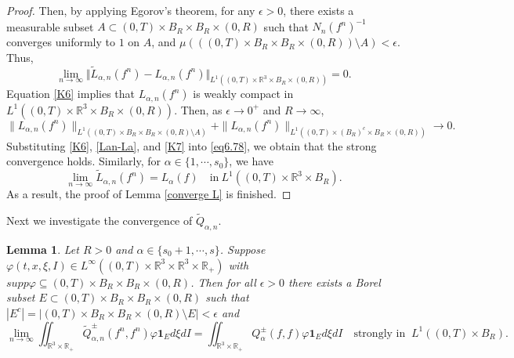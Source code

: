 \documentclass[reqno,11pt]{amsart}
\newtheorem{lemma}{Lemma}[section]
\numberwithin{equation}{section}
\def\R{\mathbb{R}}
\begin{document}
\begin{proof}
Then, by applying Egorov's theorem, for any $\epsilon > 0$, there exists a measurable subset $A \subset (0, T) \times B_R \times B_R \times (0, R)$ such that $ N_n (f^n)^{-1} $ converges uniformly to $1$ on $A$, and $\mu \left(((0, T) \times B_R \times B_R \times (0, R)) \setminus A\right) < \epsilon$. Thus,
\begin{equation}\label{Lan-La}
	\lim_{n\to\infty} \Vert \tilde{L}_{\alpha ,n}(f^n) - {L}_{\alpha ,n}(f^n) \Vert_{L^1((0,T)\times \R^3 \times B_R \times (0,R))}=0.
\end{equation}
Equation \eqref{K6} implies that $L_{\alpha,n}(f^n)$ is weakly compact in $L^1((0, T) \times \mathbb{R}^3 \times B_R \times (0, R))$. Then, as $\epsilon \to 0^+$ and $R \to \infty$,
\begin{equation}\label{K7}
	\|L_{\alpha,n}(f^n)\|_{L^1((0,T)\times B_R \times B_R \times (0,R)\setminus A)} + \|L_{\alpha,n}(f^n)\|_{L^1((0,T)\times (B_R)^c \times B_R \times (0,R))} \to 0.  
\end{equation}
Substituting \eqref{K6}, \eqref{Lan-La}, and \eqref{K7} into \eqref{eq6.78}, we obtain that the strong convergence holds.  
Similarly, for $\alpha \in \{1,\cdots,s_0\}$, we have 
\begin{equation*}
	\lim\limits_{n\rightarrow \infty } \tilde{L}_{\alpha ,n} (f^n) =L_{\alpha } (f) \quad \text{in}\ L^1((0,T)\times \R^3 \times B_R).
\end{equation*}
As a result, the proof of Lemma \ref{converge L} is finished.
\end{proof}


Next we investigate the convergence of $\tilde{Q}_{\alpha, n}$.

\begin{lemma}\label{theo-6.7}
	Let $R>0$ and $\alpha \in \{s_0+ 1,\cdots ,s\}$. Suppose $ \varphi (t, x, \xi, I) \in L^\infty ((0,T)\times \R^3 \times \R^3 \times \R_+)$ with $ supp \varphi \subseteq (0,T) \times B_R \times B_R\times (0,R)$. Then for all $\epsilon>0$ there exists a Borel subset $E\subset (0,T)\times B_R \times B_R\times (0,R)$ such that $|E^c| = | (0,T)\times B_R \times B_R\times (0,R) \setminus E | <\epsilon$ and
	\begin{equation*}
		\lim \limits_{n\rightarrow \infty } \iint_{ \R^3 \times \R_+} \tilde{Q}^\pm_{\alpha ,n} (f^n,f^n) \varphi \mathbf{1}_E d\xi dI =  \iint_{ \R^3 \times \R_+} Q^\pm_{\alpha } (f,f) \varphi \mathbf{1}_E d\xi dI \quad \text{strongly in } \ L^1 ((0,T)\times B_R).
	\end{equation*}
\end{lemma}
\end{document}
